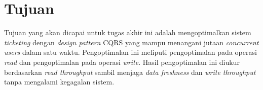 \section{Tujuan}

Tujuan yang akan dicapai untuk tugas akhir ini adalah mengoptimalkan sistem \textit{ticketing} dengan \textit{design pattern} CQRS yang mampu menangani jutaan \textit{concurrent users} dalam satu waktu. Pengoptimalan ini meliputi pengoptimalan pada operasi \textit{read} dan pengoptimalan pada operasi \textit{write}. Hasil pengoptimalan ini diukur berdasarkan \textit{read throughput} sambil menjaga \textit{data freshness} dan \textit{write throughput} tanpa mengalami kegagalan sistem.
